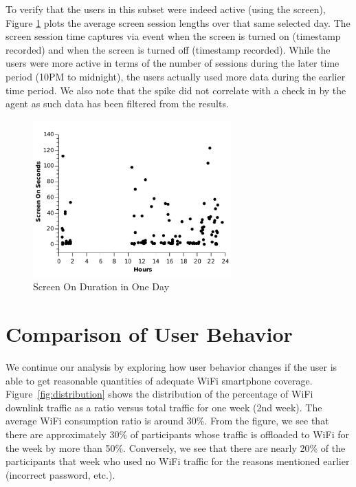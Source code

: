 To verify that the users in this subset were indeed active (using the screen), Figure \ref{fig:screen_0202} plots the average screen session lengths over that same selected day. The screen session time captures via event when the screen is turned on (timestamp recorded) and when the screen is turned off (timestamp recorded). While the users were more active in terms of the number of sessions during the later time period (10PM to midnight), the users actually used more data during the earlier time period. We also note that the spike did not correlate with a check in by the agent as such data has been filtered from the results.   

\begin{figure}[h!tbp]
\centering
\includegraphics[width = 3in]{graphs/screen_0202.pdf}
\caption{Screen On Duration in One Day} 
\label{fig:screen_0202}
\end{figure}

\section{Comparison of User Behavior}\label{comparison}
We continue our analysis by exploring how user behavior changes if the user is able to get reasonable quantities of 
adequate WiFi smartphone coverage. Figure~\ref{fig:distribution} shows the distribution of the percentage of WiFi downlink
traffic as a ratio versus total traffic for one week (2nd week). The average WiFi consumption ratio is around 30\%. From the figure, we see that there are approximately 30\% of participants whose traffic is offloaded to WiFi for the week by more than 50\%. Conversely, we see that there are 
nearly 20\% of the participants that week who used no WiFi traffic for the reasons mentioned earlier (incorrect password, etc.).


